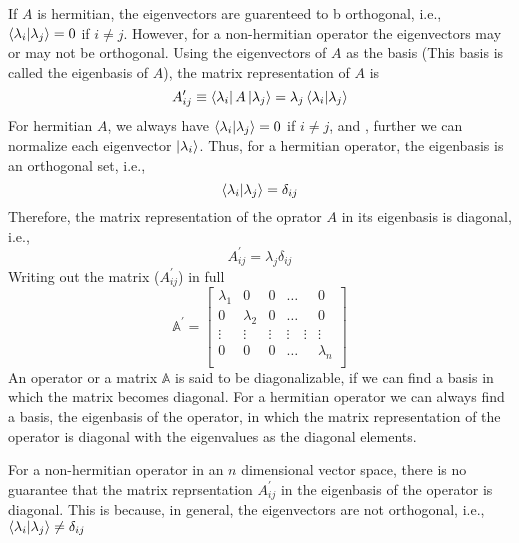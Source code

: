 	
	
	If $A$ is hermitian, the eigenvectors are guarenteed to b orthogonal, i.e., $\braket{\lambda_i}{\lambda_j} = 0$ if $i\neq j$. However, for a non-hermitian operator the eigenvectors may or may not be orthogonal.
	Using the eigenvectors of $A$ as the basis (This basis is called the eigenbasis of $A$), the matrix representation of $A$ is
	\begin{equation}
		A_{ij}^\prime \equiv \bra{\lambda_i} A \ket{\lambda_j} = \lambda_j \braket{\lambda_i}{\lambda_j}
		\label{chapter5.eqn8-matrix-reps}
	\end{equation}
	For hermitian $A$, we always have $\braket{\lambda_i}{\lambda_j} = 0$ if $i \neq j$, and , further we can normalize each eigenvector $\ket{\lambda_i}$. Thus, for a hermitian operator, the eigenbasis is an orthogonal set, i.e., 
	\begin{equation}
		\braket{\lambda_i}{\lambda_j} = \delta_{ij}
		\label{chapter5.eqn9-eigenbasis}
	\end{equation}
	Therefore, the matrix representation of the oprator $A$ in its eigenbasis is diagonal, i.e.,
	\begin{equation}
		A_{ij}^\prime = \lambda_j\delta_{ij}
		\label{chapter5.eqn9-matrix-reps-diagonal}
	\end{equation}
	Writing out the matrix ($A_{ij}^\prime$) in full
	\begin{equation}
		\mathbb{A}^\prime = \left[
		\begin{matrix}
			\lambda_1 &	0	& 0	& \ldots	& 0 \\			
			0 &	\lambda_2	& 0	& \ldots	& 0 \\
			\vdots &	\vdots	& \vdots	& \vdots \quad \vdots	& \vdots \\	
			0 & 0	& 	 0 & \ldots	& \lambda_n  \\
		\end{matrix}
		\right]
	\end{equation}
	An operator or a matrix $\mathbb{A}$ is said to be diagonalizable, if we can find a basis in which the matrix becomes diagonal. For a hermitian operator we can always find a basis, the eigenbasis of the operator, in which the matrix representation of the operator is diagonal with the eigenvalues as the diagonal elements.
	
	
	
	For a non-hermitian operator in an $n$  dimensional vector space, there is no guarantee that the matrix reprsentation $A_{ij}^\prime$ in the eigenbasis of the operator is diagonal. This is because, in general, the eigenvectors are  not orthogonal, i.e., $\braket{\lambda_i}{\lambda_j} \neq \delta_{ij}$
	
